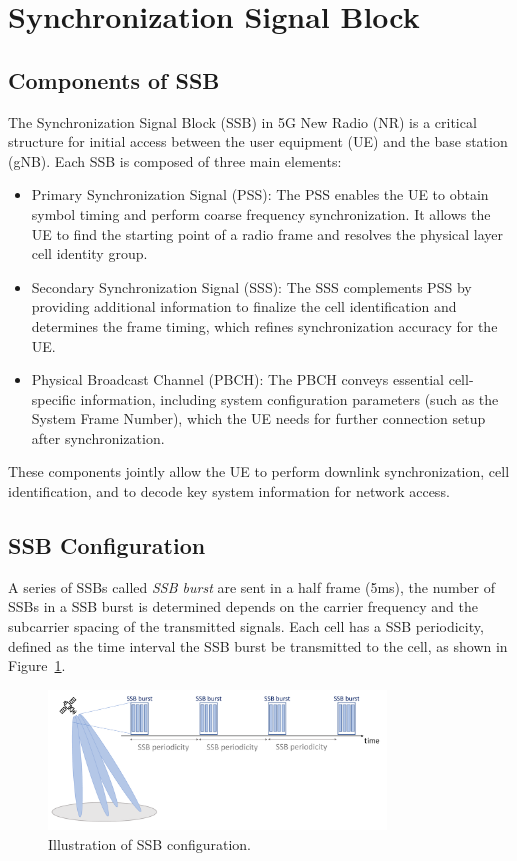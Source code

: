 \section{Synchronization Signal Block}
\subsection{Components of SSB}
The Synchronization Signal Block (SSB) in 5G New Radio (NR) is a critical structure for initial access between the user equipment (UE) and the base station (gNB). Each SSB is composed of three main elements:
\begin{itemize}
    \item Primary Synchronization Signal (PSS): The PSS enables the UE to obtain symbol timing and perform coarse frequency synchronization. It allows the UE to find the starting point of a radio frame and resolves the physical layer cell identity group.
    \item Secondary Synchronization Signal (SSS): The SSS complements PSS by providing additional information to finalize the cell identification and determines the frame timing, which refines synchronization accuracy for the UE.
    \item Physical Broadcast Channel (PBCH): The PBCH conveys essential cell-specific information, including system configuration parameters (such as the System Frame Number), which the UE needs for further connection setup after synchronization.
\end{itemize}
These components jointly allow the UE to perform downlink synchronization, cell identification, and to decode key system information for network access.

\subsection{SSB Configuration}
A series of SSBs called \textit{SSB burst} are sent in a half frame (5ms), the number of SSBs in a SSB burst is determined depends on the carrier frequency and the subcarrier spacing of the transmitted signals. Each cell has a SSB periodicity, defined as the time interval the SSB burst be transmitted to the cell, as shown in Figure~\ref{SSB}. 

\begin{figure}[h!]
    \centering
    \includegraphics[width=0.8\textwidth]{figure/SSB.pdf}
    \caption{Illustration of SSB configuration.}
    \label{SSB}
\end{figure}

